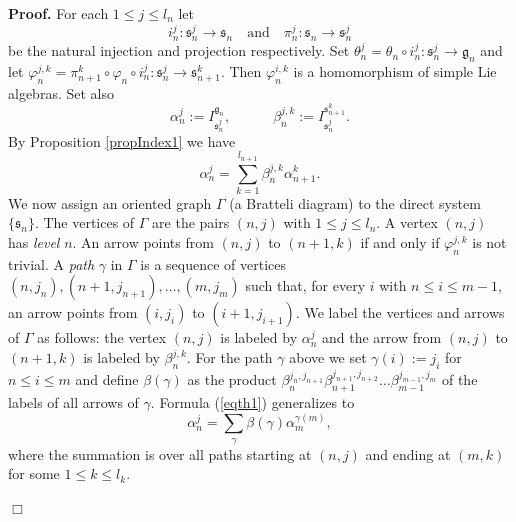 \documentclass[oneside,leqno,12pt]{article}
\newenvironment{proof}{ \noindent \textbf{Proof.}}{\hfill $\Box$}
\def\gg{\mathfrak{g}}
\renewcommand{\ss}{\mathfrak{s}}
\renewcommand{\gg}{\mathfrak{g}}
\renewcommand {\phi} {\varphi}
\newcommand{\refprop}[1]{Proposition \ref{#1}}
\newcommand{\refeq}[1]{(\ref{#1})}
\begin{document}
\begin{proof}
For each $1\leq j \leq l_n$ let 
\[
i_n^j:\ss_n^j\to\ss_n\quad\mathrm{and}\quad \pi_n^j:\ss_n\to\ss_n^j
\]
be the natural injection and projection respectively. Set $\theta_n^j=\theta_n\circ i_n^j:\ss_n^j \to\gg_n$ and let $\phi_n^{j,k}=\pi_{n+1}^k\circ\phi_n\circ i_n^j:\ss_n^j\to\ss_{n+1}^k$. Then $\phi_n^{i,k}$ is  a homomorphism of simple Lie algebras. Set also  
$$
\alpha_n^j:=I_{\ss_n^j}^{\gg_n}, \quad \quad \quad \beta_n^{j,k}:=I_{\ss_n^j}^{\ss_{n+1}^k}.
$$
By \refprop{propIndex1} we have
\begin{equation}\label{eqth1}
\alpha_n^j=\sum_{k=1}^{l_{n+1}}\beta_n^{j,k}\alpha_{n+1}^k.
\end{equation}
We now assign an oriented graph $\Gamma$ (a Bratteli diagram) to the direct system $\{\ss_n\}$. The vertices of $\Gamma$ are the pairs $(n,j)$ with $1\leq j\leq l_n$. A vertex $(n,j)$ has \emph{level} $n$. An arrow points from $(n,j)$ to $(n+1,k)$ if and only if $\phi_n^{j,k}$ is not trivial. 
A \emph{path} $\gamma$ in $\Gamma$ is a sequence of vertices $(n,j_n),(n+1,j_{n+1}),\dots,(m,j_m)$ such that, for every $i$ with $n\leq i\leq m-1$,  an arrow points from $(i,j_i)$ to  $(i+1,j_{i+1})$. We label the vertices and arrows of $\Gamma$ as follows: the vertex $(n,j)$ is labeled by $\alpha_n^j$ and the arrow from $(n,j)$ to $(n+1,k)$ is labeled by $\beta_n^{j,k}$. For the path $\gamma$ above we set $\gamma(i):=j_i$ for $n\leq i\leq m$ and define  $\beta(\gamma)$ as the product $\beta_n^{j_n,j_{n+1}}\beta_{n+1}^{j_{n+1},j_{n+2}} \dots\beta_{m-1}^{j_{m-1},j_m}$  of the labels of all arrows of $\gamma$. Formula \refeq{eqth1} generalizes to 
\begin{equation}
\label{eqth1-2}\alpha_n^j=\sum_\gamma\beta(\gamma)\alpha_m^{\gamma(m)},
\end{equation}
where the summation is over all paths starting at $(n,j)$ and ending at $(m,k)$ for some $1\leq k\leq l_k$. 


\end{proof}
\end{document}
